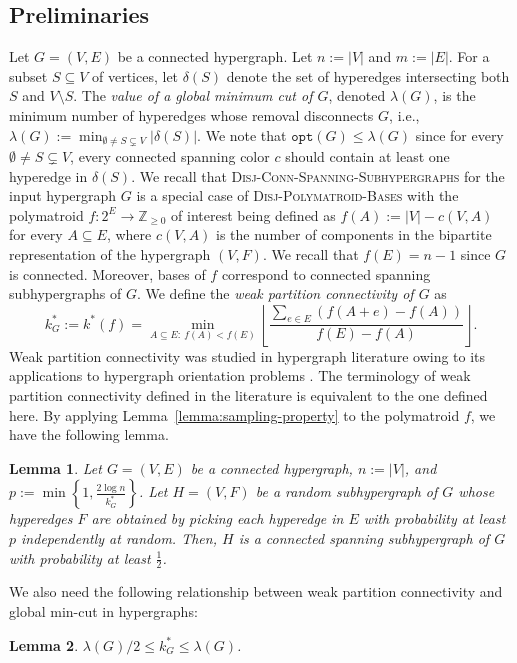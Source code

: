 \documentclass[11pt]{article}
\newtheorem{lemma}{Lemma}
\theoremstyle{definition}
\newcommand{\Z}{\mathbb{Z}}
\newcommand{\DPB}{\textsc{Disj-Polymatroid-Bases}\xspace}
\newcommand{\DCSS}{\textsc{Disj-Conn-Spanning-Subhypergraphs}\xspace}
\newcommand{\opt}{\texttt{opt}}
\begin{document}
\subsection{Preliminaries}\label{subsection:hypergraph-prelim}
Let $G=(V,E)$ be a connected hypergraph. Let $n:=|V|$ and $m:=|E|$. For a subset $S\subseteq V$ of vertices, let $\delta(S)$ denote the set of hyperedges intersecting both $S$ and $V\setminus S$. The \emph{value of a global minimum cut of $G$}, denoted $\lambda(G)$, is the minimum number of hyperedges whose removal disconnects $G$, i.e., $\lambda(G):=\min_{\emptyset\neq S\subsetneq V} |\delta(S)|$. We note that $\opt(G)\leq \lambda(G)$ since for every $\emptyset\neq S\subsetneq V$, every connected spanning color $c$ should contain at least one hyperedge in $\delta(S)$. We recall that \DCSS for the input hypergraph $G$ is a special case of \DPB with the polymatroid $f:2^E\rightarrow \Z_{\ge 0}$ of interest being defined as $f(A):=|V|-c(V,A)$ for every $A\subseteq E$, where $c(V,A)$ is the number of components in the bipartite representation of the hypergraph $(V,F)$. We recall that $f(E)=n-1$ since $G$ is connected. Moreover, bases of $f$ correspond to connected spanning subhypergraphs of $G$. We define the \emph{weak partition connectivity of $G$} as \[
k^*_G:=k^*(f)= \min_{A\subseteq E:\ f(A)<f(E)}\left\lfloor \frac{\sum_{e\in E}(f(A+e)-f(A))}{f(E)-f(A)}\right\rfloor. 
\]
Weak partition connectivity was studied in hypergraph literature owing to its applications to hypergraph orientation problems \cite{Frank-book}. The terminology of weak partition connectivity defined in the literature is equivalent to the one defined here. 
By applying Lemma~\ref{lemma:sampling-property} to the polymatroid $f$, we have the following lemma. 

\begin{lemma}\label{lemma:sampling-property-hypergraph}
    Let $G=(V, E)$ be a connected hypergraph, $n:=|V|$, and $p:=\min\left\{1, \frac{2\log n}{k^*_G}\right\}$. 
    Let $H=(V,F)$ be a random subhypergraph of $G$ whose hyperedges $F$ are obtained by picking each hyperedge in $E$ with probability at least $p$ independently at random. Then, $H$ is a connected spanning subhypergraph of $G$ with probability at least $\frac{1}{2}$.
\end{lemma}

We also need the following relationship between weak partition connectivity and global min-cut in hypergraphs: 


\begin{lemma}\cite{CCV09}\label{lemma:CCV-hypergraph}
    $\lambda(G)/2 \leq k^*_G \leq \lambda(G)$.
\end{lemma}
\end{document}
